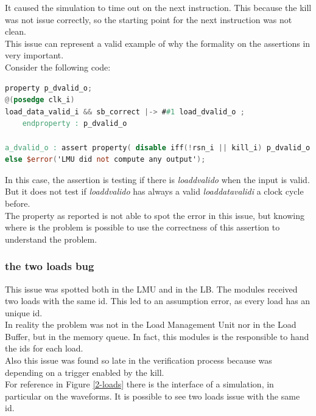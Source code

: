 It caused the simulation to time out on the next instruction. This because the kill was not issue correctly, so the starting point for the next instruction was not clean. \\

This issue can represent a valid example of why the formality on the assertions in very important.\\
Consider the following code:\\

\linespread{1}
\begin{lstlisting}[language=Verilog,style=verilog-style, backgroundcolor=\color{lyel_palette}, frame=tlb]
property p_dvalid_o;
@(posedge clk_i)
load_data_valid_i && sb_correct |-> ##1 load_dvalid_o ;
	endproperty : p_dvalid_o

a_dvalid_o : assert property( disable iff(!rsn_i || kill_i) p_dvalid_o )
else $error('LMU did not compute any output');
\end{lstlisting}
\linespread{1.2}

In this case, the assertion is testing if there is \emph{load\+dvalid\+o} when the input is valid. But it does not test if \emph{load\+dvalid\+o} has always a valid \emph{load\+data\+valid\+i} a clock cycle before.\\

The property as reported is not able to spot the error in this issue, but knowing where is the problem is possible to use the correctness of this assertion to understand the problem.\\

\subsubsection{the two loads bug}
This issue was spotted both in the LMU and in the LB. The modules received two loads with the same id. This led to an assumption error, as every load has an unique id.\\

In reality the problem was not in the Load Management Unit nor in the Load Buffer, but in the memory queue. In fact, this modules is the responsible to hand the ids for each load.\\

Also this issue was found so late in the verification process because was depending on a trigger enabled by the kill.\\

For reference in Figure \ref{2-loads} there is the interface of a simulation, in particular on the waveforms. It is possible to see two loads issue with the same id.\\

